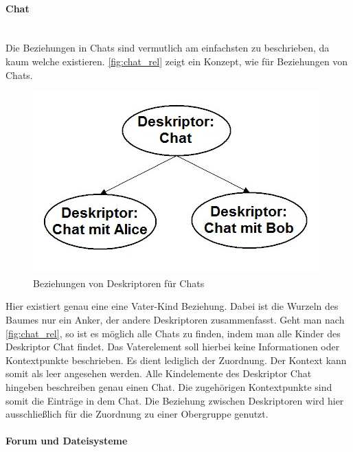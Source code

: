 \documentclass[a4paper]{article}
\begin{document}
	\paragraph{Chat}\mbox{} \\
	
	Die Beziehungen in Chats sind vermutlich am einfachsten zu beschrieben, da
	kaum welche existieren. \autoref{fig:chat_rel} zeigt ein Konzept, wie
	für Beziehungen von Chats.

	\begin{figure}[H]
		\includegraphics[width=\linewidth]{../Bilder/chat_rel.jpg}
		\caption{Beziehungen von Deskriptoren für Chats}
		\label{fig:chat_rel}
	\end{figure}
	
	Hier existiert genau eine eine Vater-Kind Beziehung. Dabei ist die
	Wurzeln des Baumes nur ein Anker, der andere Deskriptoren zusammenfasst.
	Geht man nach \autoref{fig:chat_rel}, so ist es möglich alle Chats
	zu finden, indem man alle Kinder des Deskriptor Chat findet. Das
	Vaterelement soll hierbei keine Informationen oder Kontextpunkte
	beschrieben. Es dient lediglich der Zuordnung. Der Kontext kann somit als
	leer angesehen werden. Alle Kindelemente des Deskriptor Chat hingeben
	beschreiben genau einen Chat. Die zugehörigen Kontextpunkte sind somit die
	Einträge in dem Chat. Die Beziehung zwischen Deskriptoren wird hier 
	ausschließlich für die Zuordnung zu einer Obergruppe genutzt. 
		
	\paragraph{Forum und Dateisysteme}\mbox{} \\
	
\end{document}
